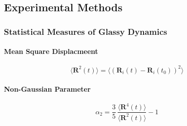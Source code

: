 \documentclass[a4paper,12pt]{article}
\renewcommand{\vec}[1]{\mathbf{#1}}
\begin{document}
\subsection{Experimental Methods}
\subsubsection{Statistical Measures of Glassy Dynamics}
\paragraph{Mean Square Displacmeent}

\begin{equation}
\langle{\vec{R}^2(t)\rangle} = \langle{\left(\vec{R}_i(t) - \vec{R}_i(t_0)\right)^2\rangle}
\end{equation}

\paragraph{Non-Gaussian Parameter}

\begin{equation}
\alpha_2 = \frac{3}{5}\,\frac{\langle{\vec{R}^4(t)\rangle}}{\langle{\vec{R}^2(t)\rangle}} - 1
\end{equation}

%
%
%
\end{document}
